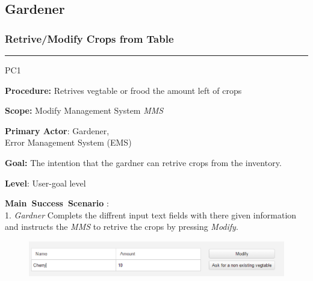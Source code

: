 \subsection{Gardener}
\subsubsection{Retrive/Modify Crops from Table}

\vspace{0.5cm}
\hrule
\hfill \break
\begin{lyxlist}{PC1}
\small{
\item [\textbf{Procedure:}] Retrives vegtable or
frood the amount left of crops
\item [\textbf{Scope:}] Modify Management System \emph{MMS}
\item [\textbf{Primary Actor}:] Gardener,\\
Error Management System (EMS)
\item [\textbf{Goal:}] The intention that the gardner can retrive crops from
the inventory.
\item [\textbf{Level}:] User-goal level
\item [\textbf{Main~Success~Scenario}]:\\
1. \emph{Gardner} Complets the diffrent input text fields with there given
information and instructs the \emph{MMS} to retrive the crops by
pressing \emph{Modify}.\\

\begin{figure}
\includegraphics[width=1\textwidth]{images/RetriveCropsBase.eps}
\end{figure}

}
\end{lyxlist}

